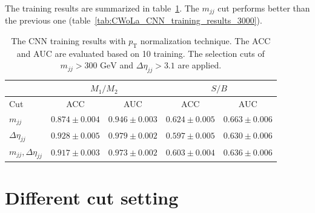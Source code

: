 \documentclass[12pt]{article}
\begin{document}
    The training results are summarized in table~\ref{tab:CWoLa_CNN_training_results_3000_pT_norm}. The $m_{jj}$ cut performs better than the previous one (table~\ref{tab:CWoLa_CNN_training_results_3000}). 
    \begin{table}[htpb]
        \centering
        \caption{The CNN training results with $p_{\text{T}}$ normalization technique. The ACC and AUC are evaluated based on 10 training. The selection cuts of $m_{jj} > \text{300 GeV}$ and $\Delta\eta_{jj} > 3.1$ are applied. }
        \label{tab:CWoLa_CNN_training_results_3000_pT_norm}
        \begin{tabular}{l|cc|cc}
                                      & \multicolumn{2}{c|}{$M_1 / M_2$}      & \multicolumn{2}{c}{$S / B$}           \\ \hline
            Cut                       & ACC               & AUC               & ACC               & AUC               \\ \hline
            $m_{jj}$                  & $0.874 \pm 0.004$ & $0.946 \pm 0.003$ & $0.624 \pm 0.005$ & $0.663 \pm 0.006$ \\
            $\Delta\eta_{jj}$         & $0.928 \pm 0.005$ & $0.979 \pm 0.002$ & $0.597 \pm 0.005$ & $0.630 \pm 0.006$ \\
            $m_{jj}, \Delta\eta_{jj}$ & $0.917 \pm 0.003$ & $0.973 \pm 0.002$ & $0.603 \pm 0.004$ & $0.636 \pm 0.006$
        \end{tabular}
    \end{table}

\section{Different cut setting}%
\label{sec:different_cut_setting}
    
\end{document}
